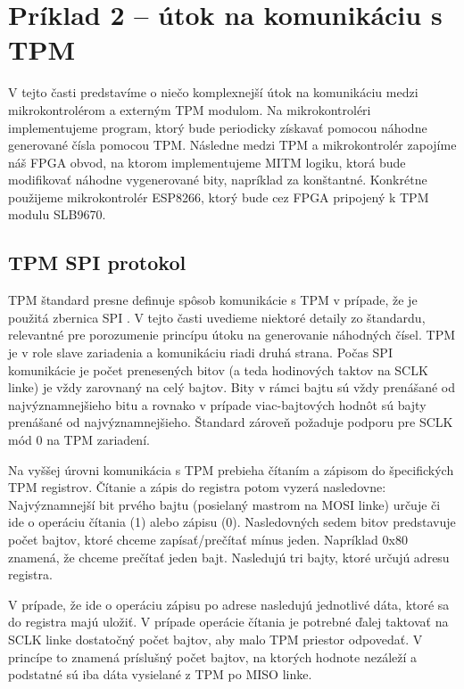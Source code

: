 \section{Príklad 2 -- útok na komunikáciu s TPM} \label{sek:example2}
V tejto časti predstavíme o niečo komplexnejší útok na komunikáciu medzi mikrokontrolérom a externým TPM modulom. Na mikrokontroléri implementujeme program, ktorý bude periodicky získavať pomocou náhodne generované čísla pomocou TPM. Následne medzi TPM a mikrokontrolér zapojíme náš FPGA obvod, na ktorom implementujeme MITM logiku, ktorá bude modifikovať náhodne vygenerované bity, napríklad za konštantné. Konkrétne použijeme mikrokontrolér ESP8266, ktorý bude cez FPGA pripojený k TPM modulu SLB9670.

\subsection{TPM SPI protokol}
TPM štandard presne definuje spôsob komunikácie s TPM v prípade, že je použitá zbernica SPI \cite{tpmTis}. V tejto časti uvedieme niektoré detaily zo štandardu, relevantné pre porozumenie princípu útoku na generovanie náhodných čísel. TPM je v role slave zariadenia a komunikáciu riadi druhá strana. Počas SPI komunikácie je počet prenesených bitov (a teda hodinových taktov na SCLK linke) je vždy zarovnaný na celý bajtov. Bity v rámci bajtu sú vždy prenášané od najvýznamnejšieho bitu a rovnako v prípade viac-bajtových hodnôt sú bajty prenášané od najvýznamnejšieho. Štandard zároveň požaduje podporu pre SCLK mód 0 na TPM zariadení.

Na vyššej úrovni komunikácia s TPM prebieha čítaním a zápisom do špecifických TPM registrov. Čítanie a zápis do registra potom vyzerá nasledovne: Najvýznamnejší bit prvého bajtu (posielaný mastrom na MOSI linke) určuje či ide o operáciu čítania (1) alebo zápisu (0). Nasledovných sedem bitov predstavuje počet bajtov, ktoré chceme zapísať/prečítať mínus jeden. Napríklad 0x80 znamená, že chceme prečítať jeden bajt. Nasledujú tri bajty, ktoré určujú adresu registra.

V prípade, že ide o operáciu zápisu po adrese nasledujú jednotlivé dáta, ktoré sa do registra majú uložiť. V prípade operácie čítania je potrebné ďalej taktovať na SCLK linke dostatočný počet bajtov, aby malo TPM priestor odpovedať. V princípe to znamená  príslušný počet bajtov, na ktorých hodnote nezáleží a podstatné sú iba dáta vysielané z TPM po MISO linke.

